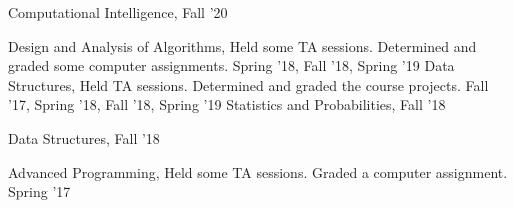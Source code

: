 



\begin{cvtas}

  \cvta
    {Computational Intelligence, } %
    {} %
    {Fall '20} %
    {} %

  \cvta
    {Design and Analysis of Algorithms, } %
    {Held some TA sessions. Determined and graded some computer assignments.} %
    {Spring '18, Fall '18, Spring '19} %
    {} %
  \cvta
    {Data Structures, } %
    {Held TA sessions. Determined and graded the course projects.} %
    {Fall '17, Spring '18, Fall '18, Spring '19} %
    {} %
  \cvta
    {Statistics and Probabilities, } %
    {} %
    {Fall '18} %
    {} %

  \cvta
    {Data Structures, } %
    {} %
    {Fall '18} %
    {} %

  \cvta
    {Advanced Programming, } %
    {Held some TA sessions. Graded a computer assignment.} %
    {Spring '17} %
    {} %


\end{cvtas}
